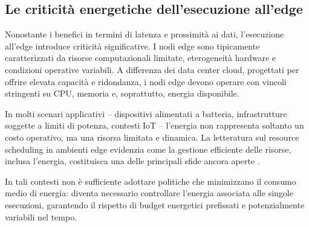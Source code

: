 \subsection{Le criticità energetiche dell'esecuzione all'edge}

Nonostante i benefici in termini di latenza e prossimità
ai dati, l'esecuzione all'edge introduce criticità significative.
I nodi edge sono tipicamente caratterizzati da risorse
computazionali limitate, eterogeneità hardware e condizioni
operative variabili. A differenza dei data center cloud,
progettati per offrire elevata capacità e ridondanza, i nodi
edge devono operare con vincoli stringenti su CPU, memoria e,
soprattutto, energia disponibile.

In molti scenari applicativi -- dispositivi alimentati a batteria,
infrastrutture soggette a limiti di potenza, contesti IoT -- l'energia
non rappresenta soltanto un costo operativo, ma una risorsa limitata
e dinamica. La letteratura sul resource scheduling in ambienti edge
evidenzia come la gestione efficiente delle risorse, inclusa
l'energia, costituisca una delle principali sfide ancora aperte
\cite{Luo2021_EdgeSchedulingSurvey,Kar2023_OffloadingFederatedSurvey}.

In tali contesti non è sufficiente adottare politiche che
minimizzano il consumo medio di energia: diventa necessario
controllare l'energia associata alle singole esecuzioni,
garantendo il rispetto di budget energetici prefissati
e potenzialmente variabili nel tempo.
